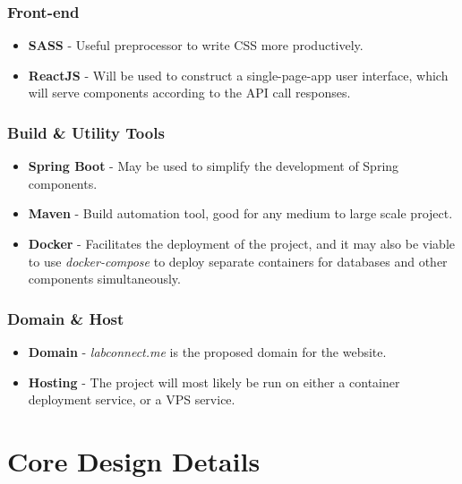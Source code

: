 \documentclass[a4paper, 12pt]{article}
\begin{document}
    \subsubsection{Front-end}

    \begin{itemize}
        \item \textbf{SASS} - Useful preprocessor to write CSS more productively.
        \item \textbf{ReactJS} - Will be used to construct a single-page-app user interface,
              which will serve components according to the API call responses.
    \end{itemize}

    \subsubsection{Build \& Utility Tools}

    \begin{itemize}
        \item \textbf{Spring Boot} - May be used to simplify the development of Spring components.
        \item \textbf{Maven} - Build automation tool, good for any medium to large scale project.
        \item \textbf{Docker} - Facilitates the deployment of the project, and it may
              also be viable to use \textit{docker-compose} to deploy separate containers
              for databases and other components simultaneously.
    \end{itemize}

    \subsubsection{Domain \& Host}

    \begin{itemize}
        \item \textbf{Domain} - \textit{labconnect.me} is the proposed domain for the website.
        \item \textbf{Hosting} - The project will most likely be run on either a container deployment service,
              or a VPS service.
    \end{itemize}

    \pagebreak

    \section{Core Design Details}
\end{document}
